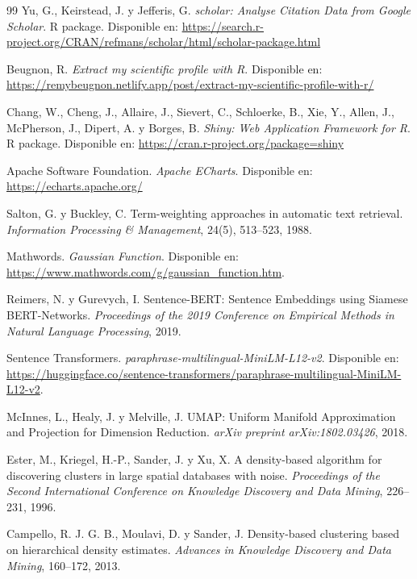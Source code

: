 \documentclass[11pt,spanish,listoffigures,listoftables]{tfgetsinf}
\begin{document}
\begin{thebibliography}{99}
Yu, G., Keirstead, J. y Jefferis, G.
\newblock \textit{scholar: Analyse Citation Data from Google Scholar}.
\newblock R package.
\newblock Disponible en: \url{https://search.r-project.org/CRAN/refmans/scholar/html/scholar-package.html}

Beugnon, R.
\newblock \textit{Extract my scientific profile with R}.
\newblock Disponible en: \url{https://remybeugnon.netlify.app/post/extract-my-scientific-profile-with-r/}

Chang, W., Cheng, J., Allaire, J., Sievert, C., Schloerke, B., Xie, Y., Allen, J.,
McPherson, J., Dipert, A. y Borges, B.
\newblock \textit{Shiny: Web Application Framework for R}.
\newblock R package. Disponible en: \url{https://cran.r-project.org/package=shiny}

Apache Software Foundation.
\newblock \textit{Apache ECharts}.
\newblock Disponible en: \url{https://echarts.apache.org/}

Salton, G. y Buckley, C.
\newblock Term-weighting approaches in automatic text retrieval.
\newblock \textit{Information Processing \& Management}, 24(5), 513--523, 1988.

Mathwords.
\newblock \textit{Gaussian Function}.
\newblock Disponible en: \url{https://www.mathwords.com/g/gaussian_function.htm}.

Reimers, N. y Gurevych, I.
\newblock Sentence-BERT: Sentence Embeddings using Siamese BERT-Networks.
\newblock \textit{Proceedings of the 2019 Conference on Empirical Methods in Natural Language Processing}, 2019.

Sentence Transformers.
\newblock \textit{paraphrase-multilingual-MiniLM-L12-v2}.
\newblock Disponible en: \url{https://huggingface.co/sentence-transformers/paraphrase-multilingual-MiniLM-L12-v2}.

McInnes, L., Healy, J. y Melville, J.
\newblock UMAP: Uniform Manifold Approximation and Projection for Dimension Reduction.
\newblock \textit{arXiv preprint arXiv:1802.03426}, 2018.

Ester, M., Kriegel, H.-P., Sander, J. y Xu, X.
\newblock A density-based algorithm for discovering clusters in large spatial databases with noise.
\newblock \textit{Proceedings of the Second International Conference on Knowledge Discovery and Data Mining}, 226--231, 1996.

Campello, R. J. G. B., Moulavi, D. y Sander, J.
\newblock Density-based clustering based on hierarchical density estimates.
\newblock \textit{Advances in Knowledge Discovery and Data Mining}, 160--172, 2013.


\end{thebibliography}
\end{document}
